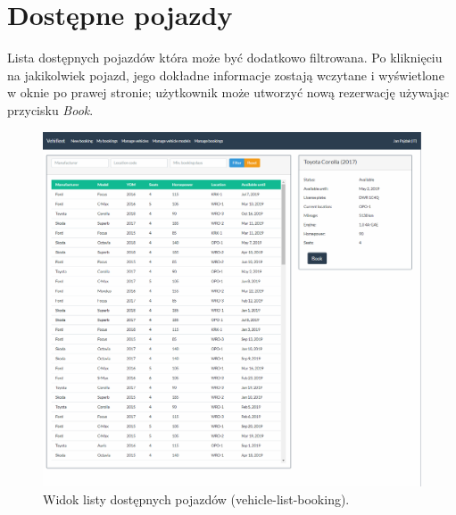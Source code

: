 \documentclass[eng,printmode,openany]{mgr}
\begin{document}
	\section{Dostępne pojazdy}
	Lista dostępnych pojazdów która może być dodatkowo filtrowana. Po kliknięciu na jakikolwiek pojazd, jego dokładne informacje zostają wczytane i wyświetlone w oknie po prawej stronie; użytkownik może utworzyć nową rezerwację używając przycisku \textit{Book}.
	\begin{figure}[H]
		\centering
		\includegraphics[width=\textwidth]{images/views/vehicle-booking-2.png}
		\caption{Widok listy dostępnych pojazdów (vehicle-list-booking).}
	\end{figure}
	
	\newpage
\end{document}
